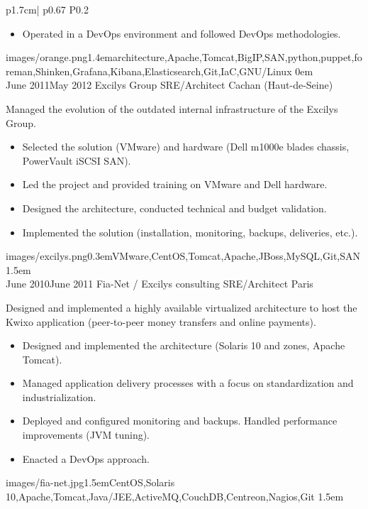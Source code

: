 \begin{longtable}{p{1.7cm}| p{} P{0.2\textwidth}}
{\begin{itemize}
        \item Operated in a DevOps environment and followed DevOps methodologies.
      \end{itemize}
    }
    {images/orange.png}{1.4em}{architecture,Apache,Tomcat,BigIP,SAN,python,puppet,foreman,Shinken,Grafana,Kibana,Elasticsearch,Git,IaC,GNU/Linux}
    {0em} \\
  \cveventdetailed
    {June 2011\newline May 2012}
    {Excilys Group}
    {SRE/Architect}
    {Cachan (Haut-de-Seine)\color{cvred}}
    {
      Managed the evolution of the outdated internal infrastructure of the Excilys Group.
      \begin{itemize}
        \item Selected the solution (VMware) and hardware (Dell m1000e blades chassis, PowerVault iSCSI SAN).
        \item Led the project and provided training on VMware and Dell hardware.
        \item Designed the architecture, conducted technical and budget validation.
        \item Implemented the solution (installation, monitoring, backups, deliveries, etc.).
      \end{itemize}
    }
    {images/excilys.png}{0.3em}{VMware,CentOS,Tomcat,Apache,JBoss,MySQL,Git,SAN}
    {1.5em} \\
  \cveventdetailed
    {June 2010\newline June 2011}
    {Fia-Net / Excilys consulting}
    {SRE/Architect}
    {Paris\color{cvred}}
    {
      Designed and implemented a highly available virtualized architecture to host the Kwixo application (peer-to-peer money transfers and online payments).
      \begin{itemize}
        \item Designed and implemented the architecture (Solaris 10 and zones, Apache Tomcat).
        \item Managed application delivery processes with a focus on standardization and industrialization.
        \item Deployed and configured monitoring and backups. Handled performance improvements (JVM tuning).
        \item Enacted a DevOps approach.
      \end{itemize}
    }
    {images/fia-net.jpg}{1.5em}{CentOS,Solaris 10,Apache,Tomcat,Java/JEE,ActiveMQ,CouchDB,Centreon,Nagios,Git}
    {1.5em} \\
  \cveventdetailed

\end{longtable}
